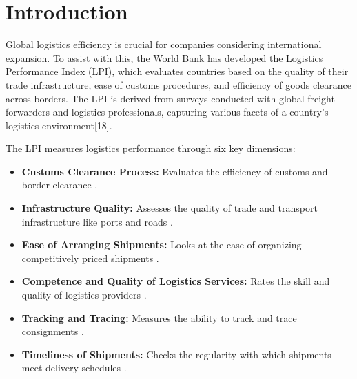 \documentclass[sigconf]{acmart}
\begin{document}



\maketitle

\section{Introduction}
Global logistics efficiency is crucial for companies considering international expansion. To assist with this, the World Bank has developed the Logistics Performance Index (LPI), which evaluates countries based on the quality of their trade infrastructure, ease of customs procedures, and efficiency of goods clearance across borders. The LPI is derived from surveys conducted with global freight forwarders and logistics professionals, capturing various facets of a country’s logistics environment[18].

The LPI measures logistics performance through six key dimensions:

\begin{itemize}
  \item \textbf{Customs Clearance Process:} Evaluates the efficiency of customs and border clearance \cite{arvis2016}.
  \item \textbf{Infrastructure Quality:} Assesses the quality of trade and transport infrastructure like ports and roads \cite{arvis2018}.
  \item \textbf{Ease of Arranging Shipments:} Looks at the ease of organizing competitively priced shipments \cite{arvis2016}.
  \item \textbf{Competence and Quality of Logistics Services:} Rates the skill and quality of logistics providers \cite{arvis2018}.
  \item \textbf{Tracking and Tracing:} Measures the ability to track and trace consignments \cite{arvis2016}.
  \item \textbf{Timeliness of Shipments:} Checks the regularity with which shipments meet delivery schedules \cite{arvis2018}.
\end{itemize}
\end{document}
